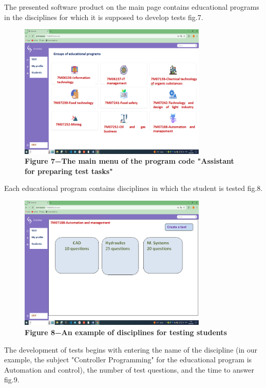 The presented software product on the main page contains educational
programs in the disciplines for which it is supposed to develop tests
fig.7.

\begin{figure}[H]
	\centering
	\includegraphics[width=0.8\textwidth]{assets/132}
	\caption*{\bfseries Figure 7−The main menu of the program code "Assistant for
	preparing test tasks"}
\end{figure}


Each educational program contains disciplines in which the student is
tested fig.8.

\begin{figure}[H]
	\centering
	\includegraphics[width=0.8\textwidth]{assets/133}
	\caption*{\bfseries Figure 8−An example of disciplines for testing students}
\end{figure}


The development of tests begins with entering the name of the discipline
(in our example, the subject "Controller Programming" for the
educational program is Automation and control), the number of test
questions, and the time to answer fig.9.

